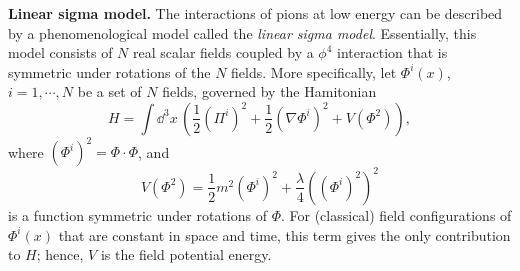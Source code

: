 \problem \textbf{Linear sigma model.} The interactions of pions at low energy can be described
by a phenomenological model called the \textit{linear sigma model}. Essentially, this model 
consists of $N$ real scalar fields coupled by a $\phi^4$ interaction that is symmetric under 
rotations of the $N$ fields. More specifically, let $\Phi^i(x)$, $i = 1, \cdots, N$ be a set of 
$N$ fields, governed by the Hamitonian
\begin{equation*}
    H = \int \dd^3x \, \left(
        \frac{1}{2}(\Pi^i)^2 + \frac{1}{2}(\nabla\Phi^i)^2 + V(\Phi^2)    
    \right),
\end{equation*}
where $(\Phi^i)^2 = \Phi\cdot\Phi$, and
\begin{equation*}
    V(\Phi^2) = \frac{1}{2}m^2(\Phi^i)^2 
    + \frac{\lambda}{4}\left((\Phi^i)^2\right)^2
\end{equation*}
is a function symmetric under rotations of $\Phi$. For (classical) field configurations of $\Phi^i(x)$
that are constant in space and time, this term gives the only contribution to $H$; hence, $V$ is the field
potential energy.

